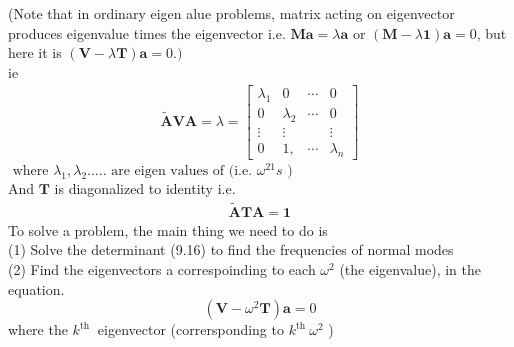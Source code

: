   (Note that in ordinary eigen alue problems, matrix acting on eigenvector produces eigenvalue times the eigenvector i.e. $\mathbf{M a}=\lambda \mathbf{a}$ or $(\mathbf{M}-\lambda \mathbf{1}) \mathbf{a}=0$, but here it is $(\mathbf{V}-\lambda \mathbf{T}) \mathbf{a}=0 .)$\\
  ie
  \begin{align}
  \tilde{\mathbf{A}} \mathbf{V} \mathbf{A}=\lambda=\left[\begin{array}{cccc}
  \lambda_{1} & 0 & \cdots & 0 \\
  0 & \lambda_{2} & \cdots & 0 \\
  \vdots & \vdots & & \vdots \\
  0 & 1, & \cdots & \lambda_{n}
  \end{array}\right]\label{ref17}
  \end{align}
  $\text { where } \lambda_{1}, \lambda_{2} \ldots . . \text { are eigen values of (i.e. } \omega^{21} s \text { ) }$\\
  And $\mathbf{T}$ is diagonalized to identity i.e.
  \begin{align}
  \tilde{\mathbf{A}} \mathbf{T} \mathbf{A}=\mathbf{1}\label{ref18}
  \end{align}
  To solve a problem, the main thing we need to do is\\
   (1) Solve the determinant (9.16) to find the frequencies of normal modes\\
  (2) Find the eigenvectors a correspoinding to each $\omega^{2}$ (the eigenvalue), in the equation.
  $$
  \left(\mathbf{V}-\omega^{2} \mathbf{T}\right) \mathbf{a}=0
  $$
  where the $k^{\text {th }}$ eigenvector (corrersponding to $k^{\text {th }} \omega^{2}$ )
  
